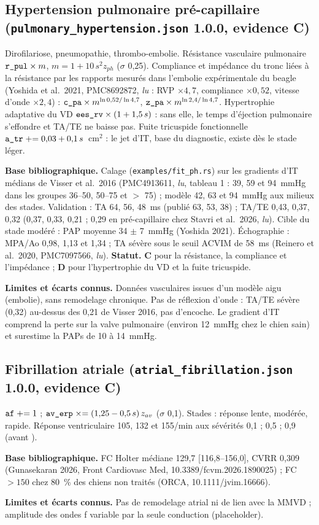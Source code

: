 \documentclass[10pt,a4paper]{article}
\newcommand{\cmd}[1]{\texttt{#1}}
\newcommand{\vp}[1]{\text{\texttt{\detokenize{#1}}}}
\newcommand{\evC}{\textcolor{orange!80!black}{\textbf{C}}}
\newcommand{\evD}{\textcolor{red!70!black}{\textbf{D}}}
\newcommand{\acc}[1]{\textsl{#1}}
\newcommand{\limite}[1]{\par\textbf{Limites et écarts connus.} #1}
\newcommand{\sources}[1]{\par\textbf{Base bibliographique.} #1}
\begin{document}
\subsection{Hypertension pulmonaire pré-capillaire (\cmd{pulmonary\_hypertension.json} 1.0.0, evidence C)}\label{sec:htp}
Dirofilariose, pneumopathie, thrombo-embolie. Résistance vasculaire pulmonaire $\vp{r_pul} \times m$, $m = 1 + 10\,s^2 z_{ph}$ ($\sigma$ 0,25). Compliance et impédance du tronc liées à la résistance par les rapports mesurés dans l'embolie expérimentale du beagle (Yoshida et al.\ 2021, PMC8692872, \acc{lu} : RVP $\times 4{,}7$, compliance $\times 0{,}52$, vitesse d'onde $\times 2{,}4$) : $\vp{c_pa} \times m^{\ln 0{,}52/\ln 4{,}7}$, $\vp{z_pa} \times m^{\ln 2{,}4/\ln 4{,}7}$. Hypertrophie adaptative du VD $\vp{ees_rv} \times (1 + 1{,}5\,s)$ : sans elle, le temps d'éjection pulmonaire s'effondre et TA/TE ne baisse pas. Fuite tricuspide fonctionnelle $\vp{a_tr} \mathrel{+}= 0{,}03 + 0{,}1\,s$~cm$^2$ : le jet d'IT, base du diagnostic, existe dès le stade léger.
\sources{Calage (\cmd{examples/fit\_ph.rs}) sur les gradients d'IT médians de Visser et al.\ 2016 (PMC4913611, \acc{lu}, tableau 1 : 39, 59 et 94~mmHg dans les groupes 36--50, 50--75 et $>$ 75) ; modèle 42, 63 et 94~mmHg aux milieux des stades. Validation : TA 64, 56, 48~ms (publié 63, 53, 38) ; TA/TE 0,43, 0,37, 0,32 (0,37, 0,33, 0,21 ; 0,29 en pré-capillaire chez Stavri et al.\ 2026, \acc{lu}). Cible du stade modéré : PAP moyenne 34 $\pm$ 7~mmHg (Yoshida 2021). Échographie : MPA/Ao 0,98, 1,13 et 1,34 ; TA sévère sous le seuil ACVIM de 58~ms (Reinero et al.\ 2020, PMC7097566, \acc{lu}).}
\textbf{Statut.} \evC{} pour la résistance, la compliance et l'impédance ; \evD{} pour l'hypertrophie du VD et la fuite tricuspide.
\limite{Données vasculaires issues d'un modèle aigu (embolie), sans remodelage chronique. Pas de réflexion d'onde : TA/TE sévère (0,32) au-dessus des 0,21 de Visser 2016, pas d'encoche. Le gradient d'IT comprend la perte sur la valve pulmonaire (environ 12~mmHg chez le chien sain) et surestime la PAPs de 10 à 14~mmHg.}

\subsection{Fibrillation atriale (\cmd{atrial\_fibrillation.json} 1.0.0, evidence C)}
$\vp{af} \mathrel{+}= 1$ ; $\vp{av_erp} \mathrel{\times}= (1{,}25 - 0{,}5\,s)\,z_{av}$ ($\sigma$ 0,1). Stades : réponse lente, modérée, rapide. Réponse ventriculaire 105, 132 et 155/min aux sévérités 0,1 ; 0,5 ; 0,9 (avant \vp{av_symp}).
\sources{FC Holter médiane 129,7 [116,8--156,0], CVRR 0,309 (Gunasekaran 2026, Front Cardiovasc Med, 10.3389/fcvm.2026.1890025) ; FC $> 150$ chez 80~\% des chiens non traités (ORCA, 10.1111/jvim.16666).}
\limite{Pas de remodelage atrial ni de lien avec la MMVD ; amplitude des ondes f variable par la seule conduction (placeholder).}
\end{document}
